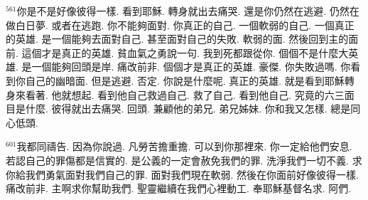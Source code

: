 \documentclass{book}
\begin{document}
$^{561}$你是不是好像彼得一樣.
看到耶穌.
轉身就出去痛哭.
還是你仍然在逃避.
仍然在做白日夢.
或者在逃跑.
你不能夠面對.
你真正的自己.
一個軟弱的自己.
一個真正的英雄.
是一個能夠去面對自己.
甚至面對自己的失敗.
軟弱的面.
然後回到主的面前.
這個才是真正的英雄.
貧血氣之勇說一句.
我到死都跟從你.
個個不是什麼大英雄.
是一個能夠回頭是岸.
痛改前非.
個個才是真正的英雄.
豪傑.
你失敗過嗎.
你看到你自己的幽暗面.
但是逃避.
否定.
你說是什麼呢.
真正的英雄.
就是看到耶穌轉身來看著.
他就想起.
看到他自己救過自己.
救了自己.
看到他自己.
究竟的六三面目是什麼.
彼得就出去痛哭.
回頭.
兼顧他的弟兄.
弟兄姊妹.
你和我又怎樣.
總是同心低頭.

$^{601}$我都同禱告.
因為你說過.
凡勞苦擔重擔.
可以到你那裡來.
你一定給他們安息.
若認自己的罪傷都是信實的.
是公義的一定會赦免我們的罪.
洗淨我們一切不義.
求你給我們勇氣面對我們自己的罪.
面對我們現在軟弱.
然後在你面前好像彼得一樣.
痛改前非.
主啊求你幫助我們.
聖靈繼續在我們心裡動工.
奉耶穌基督名求.
阿們.
\newpage
\end{document}
